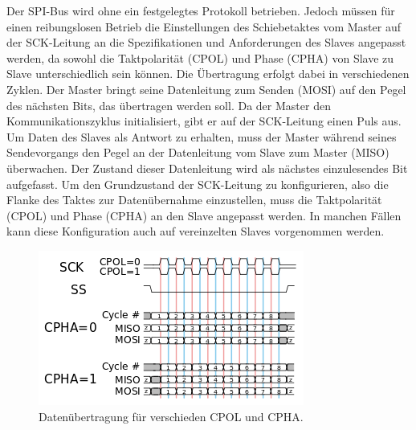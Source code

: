 Der SPI-Bus wird ohne ein festgelegtes Protokoll betrieben. Jedoch müssen für einen reibungslosen
Betrieb die Einstellungen des Schiebetaktes vom Master auf der SCK-Leitung an
die Spezifikationen und Anforderungen des Slaves angepasst werden, da sowohl die Taktpolarität
(CPOL) und Phase (CPHA) von Slave zu Slave unterschiedlich sein können. Die Übertragung erfolgt dabei in verschiedenen Zyklen. Der Master bringt seine Datenleitung zum Senden (MOSI) auf den Pegel des nächsten Bits, das übertragen werden soll. Da der Master den Kommunikationszyklus initialisiert, gibt er auf der SCK-Leitung einen Puls aus. Um Daten des Slaves als Antwort zu erhalten, muss der Master während seines Sendevorgangs den
Pegel an der Datenleitung vom Slave zum Master (MISO) überwachen. Der Zustand dieser
Datenleitung wird als nächstes einzulesendes Bit aufgefasst. Um den Grundzustand der SCK-Leitung zu konfigurieren, also die Flanke des Taktes zur Datenübernahme einzustellen, muss die Taktpolarität (CPOL) und Phase (CPHA) an den Slave angepasst werden. In manchen Fällen kann diese Konfiguration auch auf vereinzelten Slaves vorgenommen werden.

\begin{figure}[H] \centering
\includegraphics[width=\textwidth]{Images/SPI_timing_diagram2.png} 
\vspace{-0.3cm} 
\caption{Datenübertragung für verschieden CPOL und CPHA.}
\label{fig-elise} 
\end{figure}